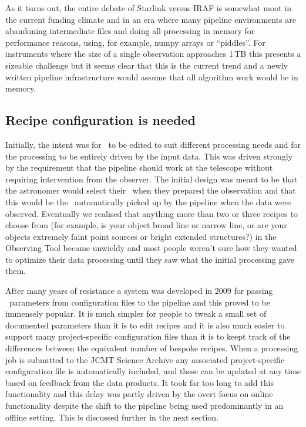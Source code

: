 \documentclass[final,authoryear,5p,times,twocolumn]{elsarticle}
\begin{document}
As it turns out, the entire debate of Starlink versus IRAF is somewhat
moot in the current funding climate and in an era where many pipeline
environments \citep[e.g.,][]{2010SPIE.7740E..15A} are abandoning
intermediate files and doing all processing in memory for performance
reasons, using, for example, numpy arrays or ``piddles''. For
instruments where the size of a single observation approaches 1\,TB
\citep[e.g., SWCam at CCAT;][]{2014SPIE9153-21} this presents a
sizeable challenge but it seems clear that this is the current trend
and a newly written pipeline infrastructure would assume that all
algorithm work would be in memory.

\subsection{Recipe configuration is needed}

Initially, the intent was for \recipes\ to be edited to suit different
processing needs and for the processing to be entirely driven by the
input data. This was driven strongly by the requirement that the
pipeline should work at the telescope without requiring intervention
from the observer. The initial design was meant to be that the
astronomer would select their \recipe\ when they prepared the
observation and that this would be the \recipe\ automatically picked
up by the pipeline when the data were observed. Eventually we realised
that anything more than two or three recipes to choose from (for
example, is your object broad line or narrow line, or are your objects
extremely faint point sources or bright extended structures?) in the
Observing Tool became unwieldy and most people weren't sure how they
wanted to optimize their data processing until they saw what the
initial processing gave them.

After many years of resistance a system was developed in 2009 for
passing \recipe\ parameters from configuration files to the pipeline
and this proved to be immensely popular. It is much simpler for people
to tweak a small set of documented parameters than it is to edit
recipes and it is also much easier to support many project-specific
configuration files than it is to keept track of the differences
between the equivalent number of bespoke recipes. When a processing
job is submitted to the JCMT Science Archive any associated
project-specific configuration file is automatically included, and
these can be updated at any time based on feedback from the data
products. It took far too long to add this functionality and this
delay was partly driven by the overt focus on online functionality
despite the shift to the pipeline being used predominantly in an
offline setting. This is discussed further in the next section.
\end{document}
